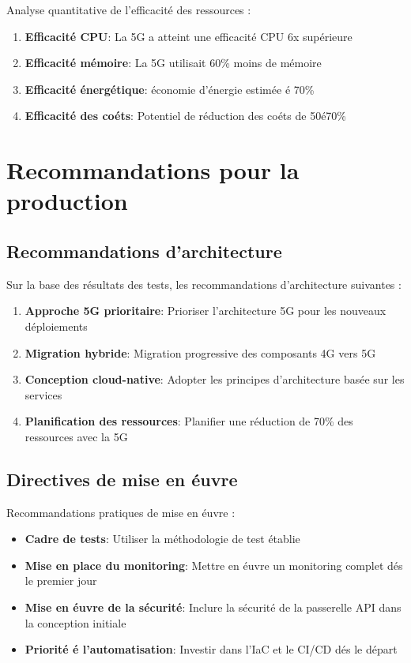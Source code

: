 \documentclass[12pt,a4paper]{report}
\begin{document}
Analyse quantitative de l'efficacité des ressources :

\begin{enumerate}
    \item \textbf{Efficacité CPU}: La 5G a atteint une efficacité CPU 6x supérieure
    \item \textbf{Efficacité mémoire}: La 5G utilisait 60\% moins de mémoire
    \item \textbf{Efficacité énergétique}: économie d'énergie estimée é 70\%
    \item \textbf{Efficacité des coéts}: Potentiel de réduction des coéts de 50é70\%
\end{enumerate}

\section{Recommandations pour la production}

\subsection{Recommandations d'architecture}

Sur la base des résultats des tests, les recommandations d'architecture suivantes :

\begin{enumerate}
    \item \textbf{Approche 5G prioritaire}: Prioriser l'architecture 5G pour les nouveaux déploiements
    \item \textbf{Migration hybride}: Migration progressive des composants 4G vers 5G
    \item \textbf{Conception cloud-native}: Adopter les principes d'architecture basée sur les services
    \item \textbf{Planification des ressources}: Planifier une réduction de 70\% des ressources avec la 5G
\end{enumerate}

\subsection{Directives de mise en éuvre}

Recommandations pratiques de mise en éuvre :

\begin{itemize}
    \item \textbf{Cadre de tests}: Utiliser la méthodologie de test établie
    \item \textbf{Mise en place du monitoring}: Mettre en éuvre un monitoring complet dés le premier jour
    \item \textbf{Mise en éuvre de la sécurité}: Inclure la sécurité de la passerelle API dans la conception initiale
    \item \textbf{Priorité é l'automatisation}: Investir dans l'IaC et le CI/CD dés le départ
\end{itemize}
\end{document}
